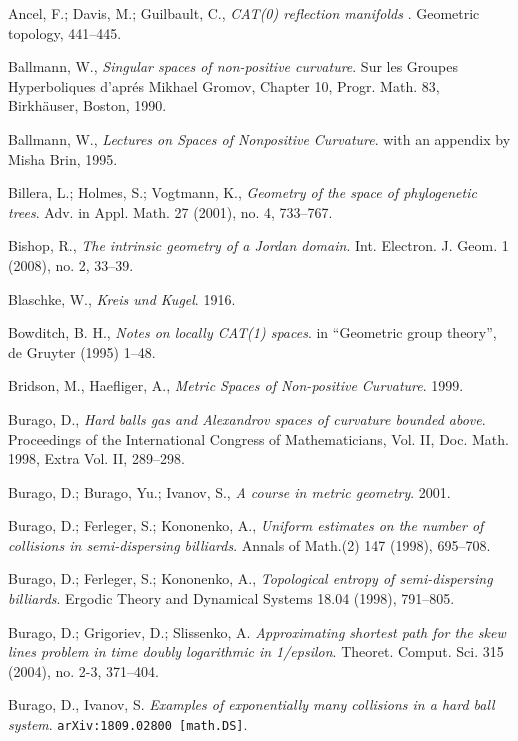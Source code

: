 \begin{thebibliography}{52}
 Ancel, F.; Davis, M.; Guilbault, C.,
\textit{CAT(0) reflection manifolds} .
Geometric topology, 
441--445.

Ballmann, W., 
\textit{Singular spaces of non-positive curvature}. 
Sur les Groupes Hyperboliques d'apr\'{e}s Mikhael Gromov, Chapter 10, Progr. Math. 83, Birkh\"auser, Boston, 1990. 

Ballmann, W., \textit{Lectures on Spaces of Nonpositive Curvature}.
with an appendix by Misha Brin, 1995. 

Billera, L.; 
Holmes, S.; 
Vogtmann, K., 
\textit{Geometry of the space of phylogenetic trees}.
Adv. in Appl. Math. 
27 
(2001), 
no. 4, 
733--767.

Bishop, R., 
\textit{The intrinsic geometry of a Jordan domain}. 
Int. Electron. J. Geom. 
1 
(2008), 
no. 2, 
33--39.

Blaschke, W., 
\textit{Kreis und Kugel}. 1916.

Bowditch, B. H.,
\textit{Notes on locally CAT(1) spaces}.
in ``Geometric group theory'', 
de Gruyter (1995) 1--48.

Bridson, M., 
Haefliger, A.,
\textit{Metric Spaces of Non-positive Curvature}. 1999.

Burago, D., 
\textit{Hard balls gas and Alexandrov spaces of curvature bounded above}.
Proceedings of the International Congress of Mathematicians, Vol. II, 
Doc. Math. 1998, 
Extra Vol. II, 
289--298.

Burago, D.; 
Burago, Yu.; 
Ivanov, S., 
\textit{A course in metric geometry}. 2001. 

Burago, D.; 
Ferleger, S.; 
Kononenko, A.,
\textit{Uniform estimates on the number of collisions in semi-dispersing billiards}.
Annals of Math.(2) 147 (1998), 695--708.

Burago, D.; 
Ferleger, S.;
Kononenko, A., 
\textit{Topological entropy of semi-dispersing billiards}.
Ergodic Theory and Dynamical Systems 
18.04 
(1998), 
791--805.

Burago, D.; Grigoriev, D.; Slissenko, A.
\textit{Approximating shortest path for the skew lines problem in time doubly logarithmic in 1/epsilon}. 
Theoret. Comput. Sci. 
315 (2004), 
no. 2-3, 
371--404. 

Burago, D., Ivanov, S. 
\textit{Examples of exponentially many collisions in a hard ball system}.
\texttt{arXiv:1809.02800 [math.DS]}.
 


\end{thebibliography}
